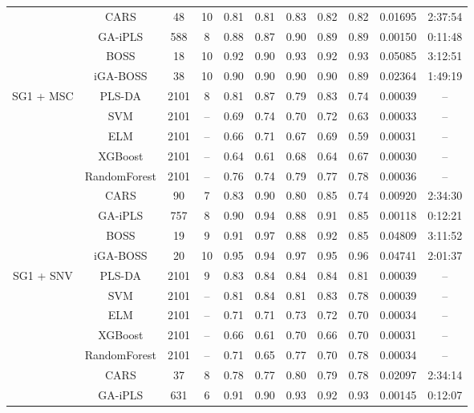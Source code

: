 \begin{table}[th!]
\begin{tabular}{ccccccccccc}
          & CARS         &   48 & 10 & 0.81 & 0.81 & 0.83 & 0.82 & 0.82 & 0.01695 & 2:37:54 \\
          & GA-iPLS      &  588 &  8 & 0.88 & 0.87 & 0.90 & 0.89 & 0.89 & 0.00150 & 0:11:48 \\
          & BOSS         &   18 & 10 & 0.92 & 0.90 & 0.93 & 0.92 & 0.93 & 0.05085 & 3:12:51 \\
          & iGA-BOSS     &   38 & 10 & 0.90 & 0.90 & 0.90 & 0.90 & 0.89 & 0.02364 & 1:49:19 \\
SG1 + MSC & PLS-DA       & 2101 &  8 & 0.81 & 0.87 & 0.79 & 0.83 & 0.74 & 0.00039 & -- \\
          & SVM          & 2101 & -- & 0.69 & 0.74 & 0.70 & 0.72 & 0.63 & 0.00033 & -- \\
          & ELM          & 2101 & -- & 0.66 & 0.71 & 0.67 & 0.69 & 0.59 & 0.00031 & -- \\
          & XGBoost      & 2101 & -- & 0.64 & 0.61 & 0.68 & 0.64 & 0.67 & 0.00030 & -- \\
          & RandomForest & 2101 & -- & 0.76 & 0.74 & 0.79 & 0.77 & 0.78 & 0.00036 & -- \\
          & CARS         &   90 &  7 & 0.83 & 0.90 & 0.80 & 0.85 & 0.74 & 0.00920 & 2:34:30 \\
          & GA-iPLS      &  757 &  8 & 0.90 & 0.94 & 0.88 & 0.91 & 0.85 & 0.00118 & 0:12:21 \\
          & BOSS         &   19 &  9 & 0.91 & 0.97 & 0.88 & 0.92 & 0.85 & 0.04809 & 3:11:52 \\
          & iGA-BOSS     &   20 & 10 & 0.95 & 0.94 & 0.97 & 0.95 & 0.96 & 0.04741 & 2:01:37 \\
SG1 + SNV & PLS-DA       & 2101 &  9 & 0.83 & 0.84 & 0.84 & 0.84 & 0.81 & 0.00039 & -- \\
          & SVM          & 2101 & -- & 0.81 & 0.84 & 0.81 & 0.83 & 0.78 & 0.00039 & -- \\
          & ELM          & 2101 & -- & 0.71 & 0.71 & 0.73 & 0.72 & 0.70 & 0.00034 & -- \\
          & XGBoost      & 2101 & -- & 0.66 & 0.61 & 0.70 & 0.66 & 0.70 & 0.00031 & -- \\
          & RandomForest & 2101 & -- & 0.71 & 0.65 & 0.77 & 0.70 & 0.78 & 0.00034 & -- \\
          & CARS         &   37 &  8 & 0.78 & 0.77 & 0.80 & 0.79 & 0.78 & 0.02097 & 2:34:14 \\
          & GA-iPLS      &  631 &  6 & 0.91 & 0.90 & 0.93 & 0.92 & 0.93 & 0.00145 & 0:12:07 \\

\end{tabular}
\end{table}
